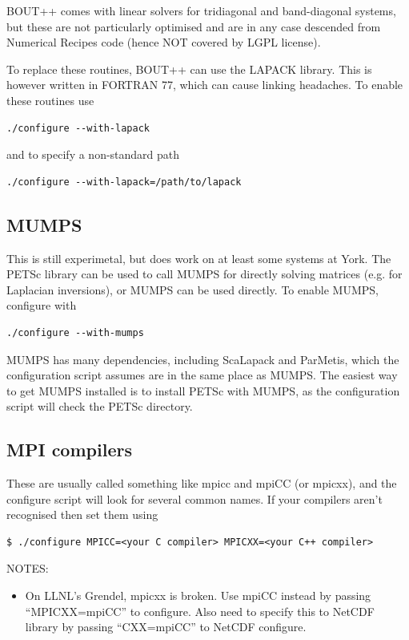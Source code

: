 \documentclass[12pt]{article}
\begin{document}
BOUT++ comes with linear solvers for tridiagonal and band-diagonal systems,
but these are not particularly optimised and are in any case descended from Numerical Recipes code (hence NOT covered by LGPL license).

To replace these routines, BOUT++ can use the LAPACK library. This is
however written in FORTRAN 77, which can cause linking headaches.
To enable these routines use
\begin{verbatim}
./configure --with-lapack
\end{verbatim}
and to specify a non-standard path
\begin{verbatim}
./configure --with-lapack=/path/to/lapack
\end{verbatim}

\subsection{MUMPS}

This is still experimetal, but does work on at least some systems at York. 
The PETSc library can be used to call MUMPS for directly solving matrices
(e.g. for Laplacian inversions), or MUMPS can be used directly. 
To enable MUMPS, configure with
\begin{verbatim}
./configure --with-mumps
\end{verbatim}
MUMPS has many dependencies, including ScaLapack and ParMetis, which the configuration script
assumes are in the same place as MUMPS. The easiest way to get MUMPS installed is to install
PETSc with MUMPS, as the configuration script will check the PETSc directory.

\subsection{MPI compilers}

These are usually called something like mpicc and mpiCC (or mpicxx), 
and the configure script will look for several common names. 
If your compilers aren't recognised then set them using
\begin{verbatim}
$ ./configure MPICC=<your C compiler> MPICXX=<your C++ compiler>
\end{verbatim}

NOTES:
\begin{itemize}
\item On LLNL's Grendel, mpicxx is broken. Use mpiCC instead by passing ``MPICXX=mpiCC'' to configure. Also need to specify this to NetCDF library by passing ``CXX=mpiCC'' to NetCDF configure.
\end{itemize}
\end{document}
